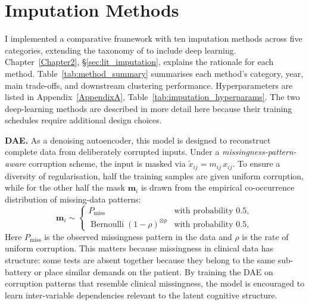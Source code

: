 
\section{Imputation Methods}\label{sec:imputation}

I implemented a comparative framework with ten imputation methods across five categories, extending the taxonomy of \textcite{afkanpour2024identify} to include deep learning. Chapter~\ref{Chapter2}, §\ref{sec:lit_imputation}, explains the rationale for each method. Table~\ref{tab:method_summary} summarises each method's category, year, main trade-offs, and downstream clustering performance. Hyperparameters are listed in Appendix~\ref{AppendixA}, Table~\ref{tab:imputation_hyperparams}. The two deep-learning methods are described in more detail here because their training schedules require additional design choices.

\noindent \textbf{DAE.} As a denoising autoencoder, this model is designed to reconstruct complete data from deliberately corrupted inputs. Under a \textit{missingness-pattern-aware} corruption scheme, the input is masked via $\tilde{x}_{ij}=m_{ij}\,x_{ij}$. To ensure a diversity of regularisation, half the training samples are given uniform corruption, while for the other half the mask $\mathbf{m}_i$ is drawn from the empirical co-occurrence distribution of missing-data patterns:
\begin{equation}\label{eq:dae_corrupt}
\mathbf{m}_i\sim
\begin{cases}
P_{\mathrm{miss}} & \text{with probability } 0.5,\\[2pt]
\operatorname{Bernoulli}(1-\rho)^{\otimes p} & \text{with probability } 0.5,
\end{cases}
\end{equation}
Here $P_{\mathrm{miss}}$ is the observed missingness pattern in the data and $\rho$ is the rate of uniform corruption. This matters because missingness in clinical data has structure: some tests are absent together because they belong to the same sub-battery or place similar demands on the patient. By training the DAE on corruption patterns that resemble clinical missingness, the model is encouraged to learn inter-variable dependencies relevant to the latent cognitive structure.

